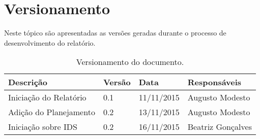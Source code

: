 \chapter[Versionamento]{Versionamento}
\label{chap:versionamento}
	Neste tópico são apresentadas as versões geradas durante o processo de desenvolvimento do relatório.
	
	\label{subsubsec:versionamento_talbe}
		\begin{table}[h]
			\centering
			\begin{tabular}{|p{6cm}|p{1.5cm}|p{2.5cm}|p{4cm}|}
				
				\hline
				
				Descrição & Versão & Data & Responsáveis \\ \hline
				Iniciação do Relatório & 0.1 & 11/11/2015 & Augusto Modesto \\ \hline
				Adição do Planejamento & 0.2 & 13/11/2015 & Augusto Modesto \\ \hline
				Iniciação sobre IDS & 0.2 & 16/11/2015 & Beatriz Gonçalves \\ \hline
				




				
			\end{tabular}
			\caption[Versionamento do Documento]{Versionamento do documento.}
			\label{tab:versionamento_tabl}
		\end{table}
